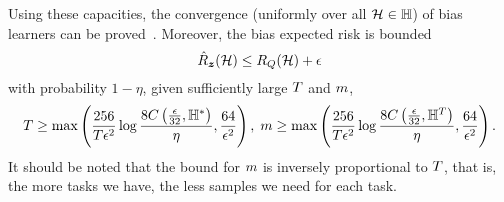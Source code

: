 Using these capacities, the convergence (uniformly over all $\mathcal{H} \in \mathbb{H}$) of bias learners can be proved~\cite[Theorem~2]{baxter2000model}. Moreover, the bias expected risk is bounded
\begin{equation}
    \nonumber
    \hat{R}_{\bm{z}}(\mathcal{H}) \leq R_Q(\mathcal{H}) + \epsilon
\end{equation}
with probability $1 - \eta$, given sufficiently large $T$ and $m$, 
\begin{equation}
    \nonumber
    T \geq \max \left( \frac{256}{T \epsilon^2} \log\frac{8C\left(\frac{\epsilon}{32}, \mathbb{H}^{*}\right)}{\eta} , \frac{64}{\epsilon^2}\right)  , \; m \geq \max \left( \frac{256}{T \epsilon^2} \log\frac{8C\left(\frac{\epsilon}{32}, \mathbb{H}^{T}\right)}{\eta} , \frac{64}{\epsilon^2}\right) .
\end{equation}
It should be noted that the bound for $m$ is inversely proportional to $T$, that is, the more tasks we have, the less samples we need for each task. 


